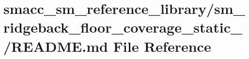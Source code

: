 \hypertarget{smacc__sm__reference__library_2sm__ridgeback__floor__coverage__static__1_2README_8md}{}\section{smacc\+\_\+sm\+\_\+reference\+\_\+library/sm\+\_\+ridgeback\+\_\+floor\+\_\+coverage\+\_\+static\+\_/\+R\+E\+A\+D\+ME.md File Reference}
\label{smacc__sm__reference__library_2sm__ridgeback__floor__coverage__static__1_2README_8md}
